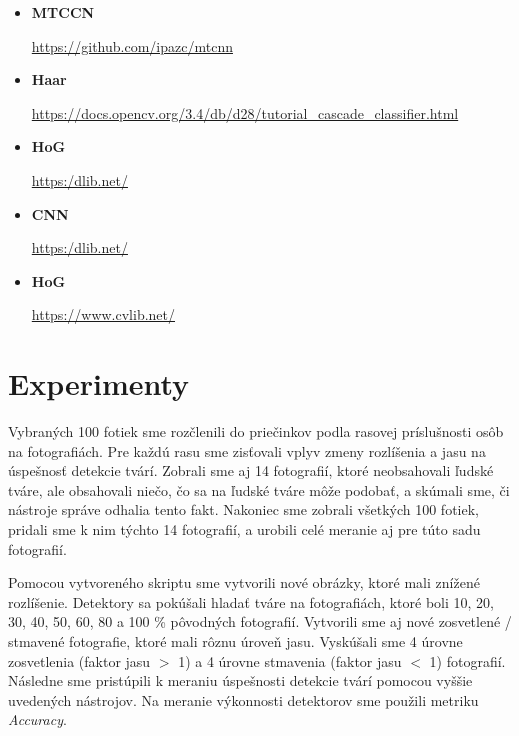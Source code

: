 \documentclass[]{article}
\begin{document}
	\begin{itemize}
		\item \textbf{MTCCN}
		
		\url{https://github.com/ipazc/mtcnn}
		
		\item \textbf{Haar}
		
		\url{https://docs.opencv.org/3.4/db/d28/tutorial_cascade_classifier.html}
		
		\item \textbf{HoG}
		
		\url{https:/dlib.net/}
		
		\item \textbf{CNN}
		
		\url{https:/dlib.net/}
		
		\item \textbf{HoG}
		
		\url{https://www.cvlib.net/}
	\end{itemize}
	
	\section{Experimenty}
	
	Vybraných 100 fotiek sme rozčlenili do priečinkov podla rasovej príslušnosti osôb na fotografiách. Pre každú rasu sme zisťovali vplyv zmeny rozlíšenia a jasu na úspešnosť detekcie tvárí. Zobrali sme aj 14 fotografií, ktoré neobsahovali ľudské tváre, ale obsahovali niečo, čo sa na ľudské tváre môže podobať, a skúmali sme, či nástroje správe odhalia tento fakt. Nakoniec sme zobrali všetkých 100 fotiek, pridali sme k nim týchto 14 fotografií, a urobili celé meranie aj pre túto sadu fotografií.
	
	Pomocou vytvoreného skriptu sme vytvorili nové obrázky, ktoré mali znížené rozlíšenie. Detektory sa pokúšali hladať tváre na fotografiách, ktoré boli 10, 20, 30, 40, 50, 60, 80 a 100 \% pôvodných fotografií. Vytvorili sme aj nové zosvetlené / stmavené fotografie, ktoré mali rôznu úroveň jasu. Vyskúšali sme 4 úrovne zosvetlenia (faktor jasu $>$ 1) a 4 úrovne stmavenia (faktor jasu $<$ 1) fotografií. Následne sme pristúpili k meraniu úspešnosti detekcie tvárí pomocou vyššie uvedených nástrojov. Na meranie výkonnosti detektorov sme použili metriku \textit{Accuracy}.
	
\end{document}
